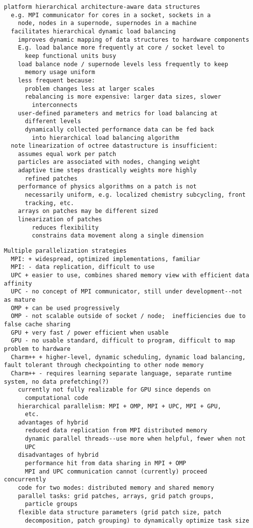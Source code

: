 \documentclass[10pt,twocolumn]{article}
\begin{document}
{\begin{verbatim}
platform hierarchical architecture-aware data structures
  e.g. MPI communicator for cores in a socket, sockets in a
    node, nodes in a supernode, supernodes in a machine
  facilitates hierarchical dynamic load balancing
    improves dynamic mapping of data structures to hardware components
    E.g. load balance more frequently at core / socket level to
      keep functional units busy
    load balance node / supernode levels less frequently to keep
      memory usage uniform
    less frequent because:
      problem changes less at larger scales
      rebalancing is more expensive: larger data sizes, slower
        interconnects
    user-defined parameters and metrics for load balancing at
      different levels
      dynamically collected performance data can be fed back
        into hierarchical load balancing algorithm
  note linearization of octree datastructure is insufficient:
    assumes equal work per patch
    particles are associated with nodes, changing weight
    adaptive time steps drastically weights more highly
      refined patches
    performance of physics algorithms on a patch is not
      necessarily uniform, e.g. localized chemistry subcycling, front
      tracking, etc.
    arrays on patches may be different sized
    linearization of patches 
        reduces flexibility
        constrains data movement along a single dimension
\end{verbatim}

\begin{verbatim}
Multiple parallelization strategies
  MPI: + widespread, optimized implementations, familiar
  MPI: - data replication, difficult to use
  UPC + easier to use, combines shared memory view with efficient data affinity
  UPC - no concept of MPI communicator, still under development--not as mature
  OMP + can be used progressively
  OMP - not scalable outside of socket / node;  inefficiencies due to false cache sharing
  GPU + very fast / power efficient when usable
  GPU - no usable standard, difficult to program, difficult to map problem to hardware
  Charm++ + higher-level, dynamic scheduling, dynamic load balancing, fault tolerant through checkpointing to other node memory
  Charm++ - requires learning separate language, separate runtime system, no data prefetching(?)
    currently not fully realizable for GPU since depends on
      computational code
    hierarchical parallelism: MPI + OMP, MPI + UPC, MPI + GPU,
      etc.
    advantages of hybrid
      reduced data replication from MPI distributed memory
      dynamic parallel threads--use more when helpful, fewer when not
      UPC
    disadvantages of hybrid
      performance hit from data sharing in MPI + OMP
      MPI and UPC communication cannot (currently) proceed concurrently
    code for two modes: distributed memory and shared memory
    parallel tasks: grid patches, arrays, grid patch groups,
      particle groups
    flexible data structure parameters (grid patch size, patch
      decomposition, patch grouping) to dynamically optimize task size
\end{verbatim}

}
\end{document}

